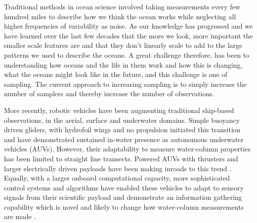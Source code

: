 

Traditional methods in ocean science involved taking measurements
every few hundred miles to describe how we think the ocean works while
neglecting all higher frequencies of variability as noise.  As our
knowledge has progressed and we have learned over the last few decades
that the more we look, more important the smaller scale features are
and that they don't linearly scale to add to the large patterns we
used to describe the oceans. A great challenge therefore, has been to
understanding how oceans and the life in them work and how this is
changing, what the oceans might look like in the future, and this
challenge is one of sampling.  The current approach to increasing
sampling is to simply increase the number of samplers and thereby
increase the number of observations.

More recently, robotic vehicles have been augmenting traditional
ship-based observations, in the aerial, surface and underwater
domains. Simple buoyancy driven gliders, with hydrofoil wings and no
propulsion initiated this transition and have demonstrated sustained
in-water presence \cite{rucool11} as autonomous underwater vehicles
(AUVs). However, their adaptability to measure water-column properties
has been limited to straight line transects. Powered AUVs with
thrusters and larger electrically driven payloads have been making
inroads to this trend \cite{loch89,dorado2004,Bellingham07}. Equally,
with a larger onboard computational capacity, more sophisticated
control systems and algorithms have enabled these vehicles to adapt to
sensory signals from their scientific payload and demonstrate an
information gathering capability which is novel and likely to change
how water-column measurements are made
\cite{bellingham94,aosn93,ryan10,das11b,das15,fossum18,fossum18b}.

